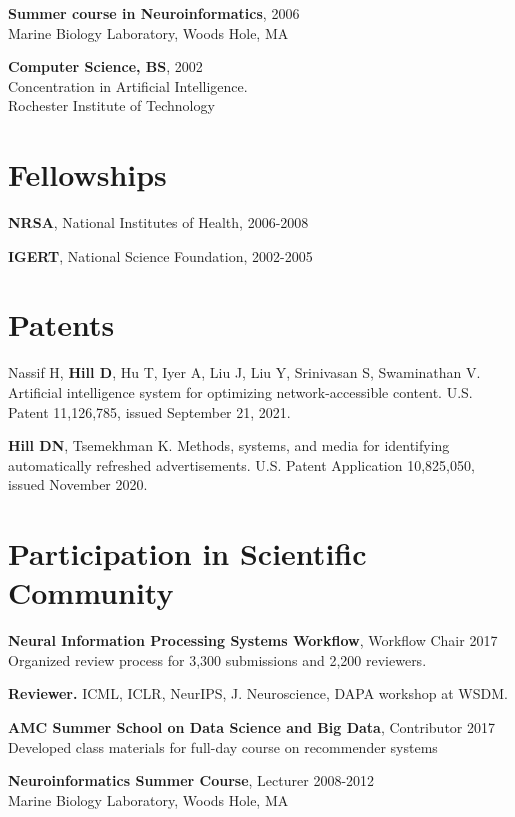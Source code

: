 \documentclass[line,11pt]{res}
\begin{document}
\begin{resume}
 	\textbf{Summer course in Neuroinformatics}, 2006 \\
    Marine Biology Laboratory, Woods Hole, MA 
    
 	\textbf{Computer Science, BS}, 2002 \\
    Concentration in Artificial Intelligence. \\
    Rochester Institute of Technology
    
\section{Fellowships}
\vspace{0.1in} 
 
 	\textbf{NRSA}, National Institutes of Health, 2006-2008
    
    \textbf{IGERT}, National Science Foundation, 2002-2005

\section{Patents}
\vspace{0.1in}
Nassif H, \textbf{Hill D}, Hu T, Iyer A, Liu J, Liu Y, Srinivasan S, Swaminathan V. Artificial intelligence system for optimizing network-accessible content. U.S. Patent 11,126,785, issued September 21, 2021.

\textbf{Hill DN}, Tsemekhman K. Methods, systems, and media for identifying automatically refreshed advertisements. U.S. Patent Application 10,825,050, issued November 2020.


\section{Participation in Scientific Community}
\vspace{0.1in} 

	\textbf{Neural Information Processing Systems Workflow}, Workflow Chair 2017 \\
    	Organized review process for 3,300 submissions and 2,200 reviewers.
    
  \textbf{Reviewer.} ICML, ICLR, NeurIPS, J. Neuroscience, DAPA workshop at WSDM.

	\textbf{AMC Summer School on Data Science and Big Data}, Contributor 2017 \\
         Developed class materials for full-day course on recommender systems
         
	\textbf{Neuroinformatics Summer Course}, Lecturer 2008-2012 \\
    Marine Biology Laboratory, Woods Hole, MA
    

\end{resume}
\end{document}
